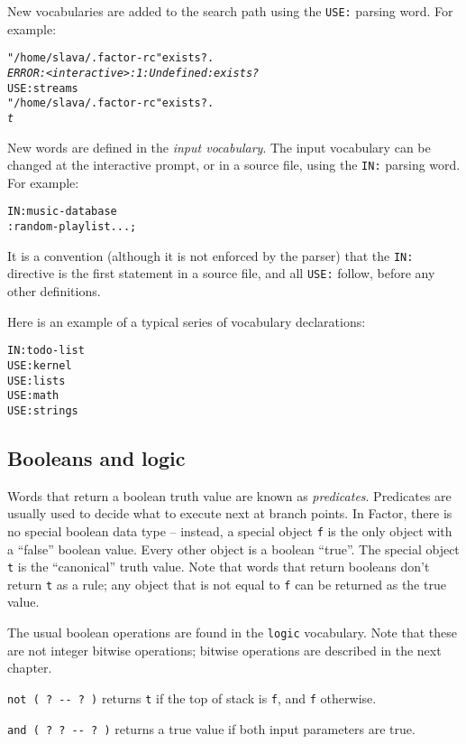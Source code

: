 \documentclass[english]{article}
\begin{document}
New vocabularies are added to the search path using the \texttt{USE:}
parsing word. For example:

\begin{alltt}
"/home/slava/.factor-rc" exists? .
\emph{ERROR: <interactive>:1: Undefined: exists?}
USE: streams
"/home/slava/.factor-rc" exists? .
\emph{t}
\end{alltt}

New words are defined in the \emph{input vocabulary}. The input vocabulary
can be changed at the interactive prompt, or in a source file, using
the \texttt{IN:} parsing word. For example:

\begin{alltt}
IN: music-database
: random-playlist ... ;
\end{alltt}
It is a convention (although it is not enforced by the parser) that
the \texttt{IN:} directive is the first statement in a source file,
and all \texttt{USE:} follow, before any other definitions.

Here is an example of a typical series of vocabulary declarations:

\begin{alltt}
IN: todo-list
USE: kernel
USE: lists
USE: math
USE: strings
\end{alltt}

\subsection{Booleans and logic}

Words that return a boolean truth value are known as \emph{predicates}. Predicates are usually used to decide what to execute next at branch points. In Factor, there is no special boolean data type
-- instead, a special object \texttt{f} is the only object with a
``false'' boolean value. Every other object is a boolean ``true''.
The special object \texttt{t} is the ``canonical'' truth value. Note that words that return booleans don't return \texttt{t} as a rule; any object that is not equal to \texttt{f} can be returned as the true value.

The usual boolean operations are found in the \texttt{logic} vocabulary. Note that these are not integer bitwise operations; bitwise operations are described in the next chapter.

\texttt{not ( ?~-{}- ?~)} returns \texttt{t} if the top of stack is \texttt{f}, and \texttt{f} otherwise.

\texttt{and ( ?~?~-{}- ?~)} returns a true value if both input parameters are true.
\end{document}
